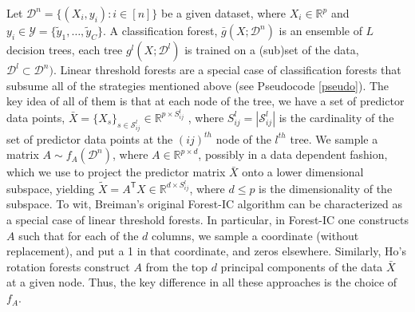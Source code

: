 \documentclass{article} %
\newcommand{\Real}{\mathbb{R}}
\providecommand{\mc}[1]{\mathcal{#1}}
\providecommand{\mt}[1]{\widetilde{#1}}
\newcommand{\T}{^{\ensuremath{\mathsf{T}}}}           %
\begin{document}
Let $\mc{D}^n=\{(X_i,y_i): i \in [n]\}$ be a given dataset, where $X_i \in \Real^p$ and $y_i \in \mc{Y} = \{\mt{y}_1,\ldots, \mt{y}_C\}$.  A classification forest, $\bar{g}(X; \mc{D}^n)$ is an ensemble of $L$ decision trees, each tree $g^l( X; \mc{D}^l)$  is trained on a (sub)set of the data, $\mc{D}^l \subset \mc{D}^n)$.
Linear threshold forests are a special case of classification forests that subsume all of the strategies mentioned above (see Pseudocode \ref{pseudo}).  The key idea of all of them is that at each node of the tree, we have a set of predictor data points, $\bar{X}=\{X_s\}_{s \in \mc{S}^l_{ij}} \in \Real^{p \times S^l_{ij}}$ , where  $S^l_{ij}=|\mc{S}^l_{ij}|$ is the cardinality of the set of predictor data points at the $(ij)^{th}$ node of the $l^{th}$ tree.
We sample a  matrix $A \sim f_A(\mc{D}^n)$, where $A \in \Real^{p \times d}$, possibly in a data dependent fashion, which we use to project the predictor matrix $\bar{X}$ onto a lower dimensional subspace, yielding $\mt{X} = A\T X \in \Real^{d \times S^l_{ij}}$, where $d \leq p$ is the dimensionality of the subspace.  To wit, Breiman's original Forest-IC algorithm can be characterized as a special case of linear threshold forests.  In particular, in Forest-IC one constructs $A$ such that for each of the $d$ columns, we sample a coordinate (without replacement), and put a 1 in that coordinate, and zeros elsewhere. Similarly, Ho's rotation forests construct $A$ from the top $d$ principal components of the data $\bar{X}$ at a given node.  Thus, the key difference in all these approaches is the choice of $f_A$. 
\end{document}
